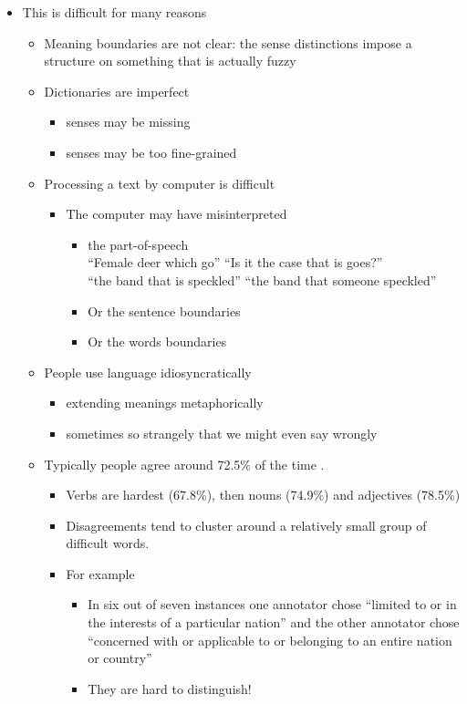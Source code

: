 \documentclass[a4paper,landscape,headrule,footrule,xetex]{foils}
\begin{document}
\begin{itemize}
\newpage 
\item This is difficult for many reasons
  \begin{itemize}
  \item Meaning boundaries are not clear: the sense distinctions
    impose a structure on something that is actually fuzzy
  \item Dictionaries are imperfect
    \begin{itemize}
    \item senses may be missing
    \item senses may be too fine-grained
    \end{itemize}
  \item Processing a text by computer is difficult
    \begin{itemize}
    \item The computer may have misinterpreted
    \begin{itemize}
    \item the part-of-speech
      \\   ``Female deer which go'' ``Is it the case that is goes?''
      \\  ``the band that is speckled'' ``the band that someone speckled''
    \item Or the sentence boundaries
    \item Or the words boundaries
    \end{itemize}
        \end{itemize}
  \item People use language idiosyncratically 
    \begin{itemize}
    \item extending meanings metaphorically
    \item sometimes so strangely that we might even say wrongly
    \end{itemize}
\newpage
  \item Typically people agree around 72.5\% of the time \citep{Snyder:Palmer:2004}.
    \begin{itemize}
    \item  Verbs are hardest (67.8\%), then nouns (74.9\%) and adjectives (78.5\%)
    \item Disagreements tend to cluster around a relatively small group of difficult words.
    \item For example 
      \begin{itemize}
      \item In six out of seven instances one annotator chose
        ``limited to or in the interests of a particular nation'' and
        the other annotator chose ``concerned with or applicable to or
        belonging to an entire nation or country''
      \item They are hard to distinguish!
      \end{itemize}
    \end{itemize}
  \end{itemize}
\end{itemize}
\end{document}
